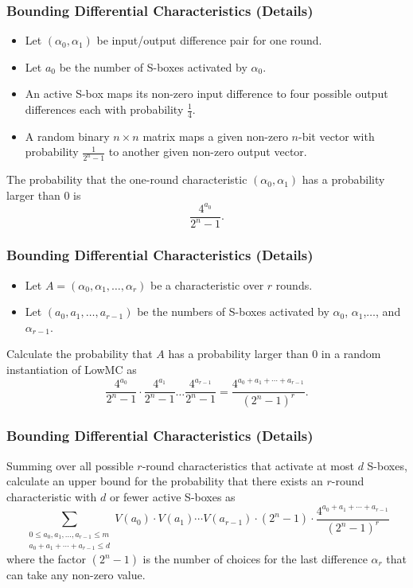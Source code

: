\documentclass[10pt,compress]{beamer}
\begin{document}
\begin{frame}
  \frametitle{Bounding Differential Characteristics (Details)}

  \begin{itemize}
  \item  Let $(α_0, α_1)$ be input/output difference pair for one round.
  \item Let $a_0$ be the number of S-boxes activated by $α_0$. 
  \item An active S-box maps its non-zero input difference to four possible output differences each with probability $\frac{1}{4}$. 
  \item A random binary $n\times n$ matrix maps a given non-zero $n$-bit vector with probability $\frac{1}{2^n-1}$ to another given non-zero output vector.
  \end{itemize}

The probability that the one-round characteristic $(α_0,α_1)$ has a probability larger than 0 is
\[\frac{4^{a_0}}{2^n-1}.\]
\end{frame}

\begin{frame}
  \frametitle{Bounding Differential Characteristics (Details)}

  \begin{itemize}
  \item Let $A = (α_0, α_1, \dots, α_r)$ be a characteristic over $r$ rounds.
  \item Let $(a_0, a_1,\dots, a_{r-1})$ be the numbers of S-boxes activated by $α_0$, $α_1$,$\dots$, and $α_{r-1}$. 
  \end{itemize}

Calculate the probability that $A$ has a probability larger than 0 in a random instantiation of LowMC as
\[\frac{4^{a_0}}{2^n-1}\cdot\frac{4^{a_1}}{2^n-1}\dots\frac{4^{a_{r-1}}}{2^n-1}
    = \frac{4^{a_0+a_1+\cdots + a_{r-1}}}{{(2^n-1)}^r}.\]

\end{frame}

\begin{frame}
  \frametitle{Bounding Differential Characteristics (Details)}

  Summing over all possible $r$-round characteristics that activate at most $d$ S-boxes, calculate an upper bound for the probability that there exists an $r$-round characteristic with $d$ or fewer active S-boxes as
  \[	\sum\limits_{\substack{0\leq a_0,a_1,\dots,a_{r-1}\leq m \\ a_0+a_1+\cdots+a_{r-1}\leq d}}
	V(a_0)\cdot V(a_1)\cdots V(a_{r-1})\cdot (2^n-1)
	\cdot \frac{4^{a_0+a_1+\cdots+a_{r-1}}}{{(2^n-1)}^{r}}
      \]
where the factor $(2^n-1)$ is the number of choices for the last difference $α_r$ that can take any non-zero value.
\end{frame}
\end{document}
